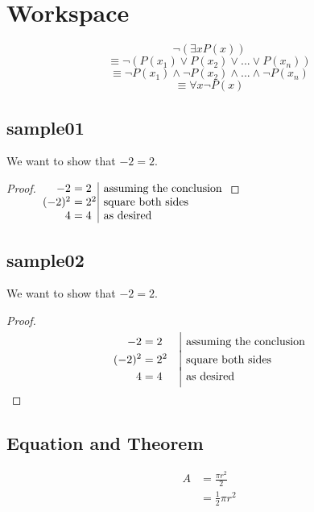 \documentclass{article}
\theoremstyle{definition}
\theoremstyle{remark}
\begin{document}
\section{Workspace}




$$\neg (\exists x P(x)) $$
$$\equiv \neg (P({x}_{1}) \lor P({x}_{2}) \lor ... \lor P({x}_{n}))$$
$$\equiv \neg P({x}_{1}) \land \neg P({x}_{2}) \land ... \land \neg P({x}_{n})$$
$$\equiv \forall x \neg P(x)$$





\subsection{sample01}
We want to show that $-2 = 2$.    
\begin{proof}
$\arraycolsep=1.5pt
\begin{array}[t]{rl|l}
-2     &= 2   & \text{ assuming the conclusion}\\
(-2)^2 &= 2^2 & \text{ square both sides} \\
4      &= 4   & \text{ as desired}
\end{array}$
\end{proof}

\subsection{sample02}
We want to show that $-2=2$.
\begin{proof}
    \begin{align*}
        -2 &= 2 && \smash{\Big|}\text{ assuming the conclusion} \\
        (-2)^2 &= 2^2 && \smash{\Big|}\text{ square both sides} \\
        4 &= 4 && \smash{\Big|}\text{ as desired}
    \end{align*}
\end{proof}



\subsection{Equation and Theorem}



        \begin{equation}\label{eq1}\begin{split}
            A & = \frac{\pi r^2}{2} \\
            & = \frac{1}{2} \pi r^2
        \end{split}\end{equation}
\end{document}
